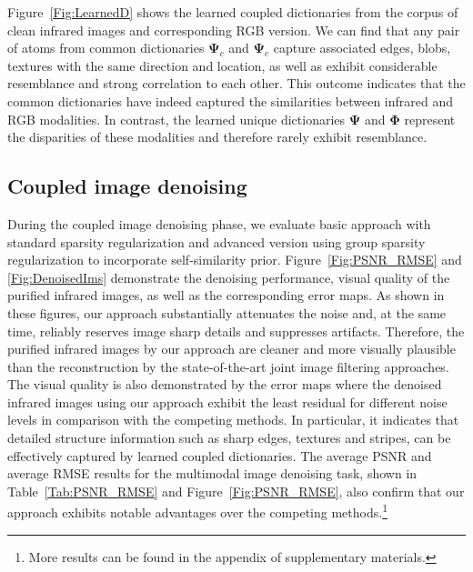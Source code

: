 \documentclass{article}
\begin{document}
Figure~\ref{Fig:LearnedD} shows the learned coupled dictionaries from the corpus of clean infrared images and corresponding RGB version. We can find that any pair of atoms from common dictionaries $\boldsymbol{\Psi}_{c}$ and $\boldsymbol{\Psi}_{c}$ capture associated edges, blobs, textures with the same direction and location, as well as exhibit considerable resemblance and strong correlation to each other. This outcome indicates that the common dictionaries have indeed captured the similarities between infrared and RGB modalities. In contrast, the learned unique dictionaries $\boldsymbol{\Psi}$ and $\boldsymbol{\Phi}$ represent the disparities of these modalities and therefore rarely exhibit resemblance.

\vspace{-0.2cm}

\subsection{Coupled image denoising}

During the coupled image denoising phase, we evaluate basic approach with standard sparsity regularization and advanced version using group sparsity regularization to incorporate self-similarity prior.
Figure~\ref{Fig:PSNR_RMSE} and \ref{Fig:DenoisedIms} demonstrate the denoising performance, visual quality of the purified infrared images, as well as the corresponding error maps. As shown in these figures, our approach substantially attenuates the noise and, at the same time, reliably reserves image sharp details and suppresses artifacts. Therefore, the purified infrared images by our approach are cleaner and more visually plausible than the reconstruction by the state-of-the-art joint image filtering approaches. The visual quality is also demonstrated by the error maps where the denoised infrared images using our approach exhibit the least residual for different noise levels in comparison with the competing methods. In particular, it indicates that detailed structure information such as sharp edges, textures and stripes, can be effectively captured by learned coupled dictionaries. The average PSNR and average RMSE results for the multimodal image denoising task, shown in Table~\ref{Tab:PSNR_RMSE} and Figure~\ref{Fig:PSNR_RMSE}, also confirm that our approach exhibits notable advantages over the competing methods.\footnote{
	More results can be found in the appendix of supplementary materials.}



\vspace{-0.2cm}
\end{document}
